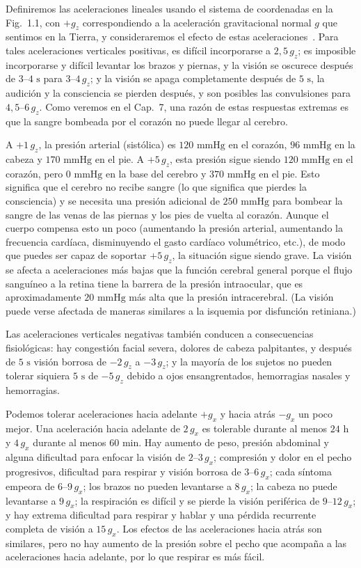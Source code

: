\documentclass[12pt]{book}
\begin{document}
Definiremos las aceleraciones lineales usando el sistema de coordenadas en la Fig.~1.1, con $+g_z$ correspondiendo a la aceleración gravitacional normal $g$ que sentimos en la Tierra, y consideraremos el efecto de estas aceleraciones~\cite{ref49,ref50}. Para tales aceleraciones verticales positivas, es difícil incorporarse a $2{,}5\,g_z$; es imposible incorporarse y difícil levantar los brazos y piernas, y la visión se oscurece después de $3$--$4\text{ s}$ para $3$--$4\,g_z$; y la visión se apaga completamente después de $5\text{ s}$, la audición y la consciencia se pierden después, y son posibles las convulsiones para $4{,}5$--$6\,g_z$. Como veremos en el Cap.~7, una razón de estas respuestas extremas es que la sangre bombeada por el corazón no puede llegar al cerebro.

A $+1\,g_z$, la presión arterial (sistólica) es $120\text{ mmHg}$ en el corazón, $96\text{ mmHg}$ en la cabeza y $170\text{ mmHg}$ en el pie. A $+5\,g_z$, esta presión sigue siendo $120\text{ mmHg}$ en el corazón, pero $0\text{ mmHg}$ en la base del cerebro y $370\text{ mmHg}$ en el pie. Esto significa que el cerebro no recibe sangre (lo que significa que pierdes la consciencia) y se necesita una presión adicional de $250\text{ mmHg}$ para bombear la sangre de las venas de las piernas y los pies de vuelta al corazón. Aunque el cuerpo compensa esto un poco (aumentando la presión arterial, aumentando la frecuencia cardíaca, disminuyendo el gasto cardíaco volumétrico, etc.), de modo que puedes ser capaz de soportar $+5\,g_z$, la situación sigue siendo grave. La visión se afecta a aceleraciones más bajas que la función cerebral general porque el flujo sanguíneo a la retina tiene la barrera de la presión intraocular, que es aproximadamente $20\text{ mmHg}$ más alta que la presión intracerebral. (La visión puede verse afectada de maneras similares a la isquemia por disfunción retiniana.)

Las aceleraciones verticales negativas también conducen a consecuencias fisiológicas: hay congestión facial severa, dolores de cabeza palpitantes, y después de $5\text{ s}$ visión borrosa de $-2\,g_z$ a $-3\,g_z$; y la mayoría de los sujetos no pueden tolerar siquiera $5\text{ s}$ de $-5\,g_z$ debido a ojos ensangrentados, hemorragias nasales y hemorragias.

Podemos tolerar aceleraciones hacia adelante $+g_x$ y hacia atrás $-g_x$ un poco mejor. Una aceleración hacia adelante de $2\,g_x$ es tolerable durante al menos $24\text{ h}$ y $4\,g_x$ durante al menos $60\text{ min}$. Hay aumento de peso, presión abdominal y alguna dificultad para enfocar la visión de $2$--$3\,g_x$; compresión y dolor en el pecho progresivos, dificultad para respirar y visión borrosa de $3$--$6\,g_x$; cada síntoma empeora de $6$--$9\,g_x$; los brazos no pueden levantarse a $8\,g_x$; la cabeza no puede levantarse a $9\,g_x$; la respiración es difícil y se pierde la visión periférica de $9$--$12\,g_x$; y hay extrema dificultad para respirar y hablar y una pérdida recurrente completa de visión a $15\,g_x$. Los efectos de las aceleraciones hacia atrás son similares, pero no hay aumento de la presión sobre el pecho que acompaña a las aceleraciones hacia adelante, por lo que respirar es más fácil.
\end{document}
